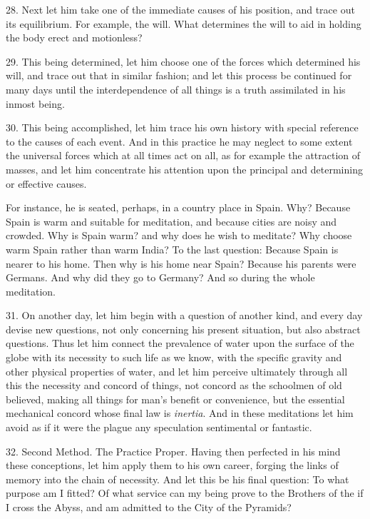 28. Next let him take one of the immediate causes of his position, and trace out its equilibrium. For example, the will. What determines the will to aid in holding the body erect and motionless?

29. This being determined, let him choose one of the forces which determined his will, and trace out that in similar fashion; and let this process be continued for many days until the interdependence of all things is a truth assimilated in his inmost being.

30. This being accomplished, let him trace his own history with special reference to the causes of each event. And in this practice he may neglect to some extent the universal forces which at all times act on all, as for example the attraction of masses, and let him concentrate his attention upon the principal and determining or effective causes.

For instance, he is seated, perhaps, in a country place in Spain. Why? Because Spain is warm and suitable for meditation, and because cities are noisy and crowded. Why is Spain warm? and why does he wish to meditate? Why choose warm Spain rather than warm India? To the last question: Because Spain is nearer to his home. Then why is his home near Spain? Because his parents were Germans. And why did they go to Germany? And so during the whole meditation.

31. On another day, let him begin with a question of another kind, and every day devise new questions, not only concerning his present situation, but also abstract questions. Thus let him connect the prevalence of water upon the surface of the globe with its necessity to such life as we know, with the specific gravity and other physical properties of water, and let him perceive ultimately through all this the necessity and concord of things, not concord as the schoolmen of old believed, making all things for man's benefit or convenience, but the essential mechanical concord whose final law is \textit{inertia}. And in these meditations let him avoid as if it were the plague any speculation sentimental or fantastic.

32. Second Method. The Practice Proper. Having then perfected in his mind these conceptions, let him apply them to his own career, forging the links of memory into the chain of necessity. And let this be his final question: To what purpose am I fitted? Of what service can my being prove to the Brothers of the \Argentium{}{} if I cross the Abyss, and am admitted to the City of the Pyramids?

